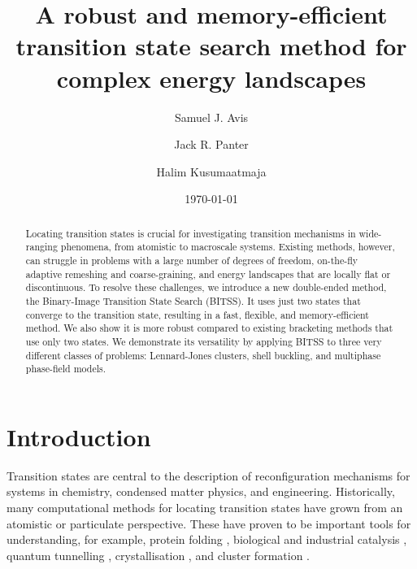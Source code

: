 \documentclass[aip,jcp,reprint,twocolumn]{revtex4-1}
\begin{document}
\title{A robust and memory-efficient transition state search method for complex energy landscapes}
\date{\today}

\author{Samuel J. Avis}
\author{Jack R. Panter}
\author{Halim Kusumaatmaja}

\begin{abstract}
  Locating transition states is crucial for investigating transition mechanisms in wide-ranging phenomena, from atomistic to macroscale systems.
  Existing methods, however, can struggle in problems with a large number of degrees of freedom, on-the-fly adaptive remeshing and coarse-graining, and energy landscapes that are locally flat or discontinuous.
  To resolve these challenges, we introduce a new double-ended method, the Binary-Image Transition State Search (BITSS).
  It uses just two states that converge to the transition state, resulting in a fast, flexible, and memory-efficient method.
  We also show it is more robust compared to existing bracketing methods that use only two states.
  We demonstrate its versatility by applying BITSS to three very different classes of problems: Lennard-Jones clusters, shell buckling, and multiphase phase-field models.
\end{abstract}

\maketitle


\section{Introduction}
Transition states are central to the description of reconfiguration mechanisms for systems in chemistry, condensed matter physics, and engineering.
Historically, many computational methods for locating transition states have grown from an atomistic or particulate perspective.
These have proven to be important tools for understanding, for example, protein folding \cite{Bryngelson1995,Onuchic1997}, biological and industrial catalysis \cite{Boehr2006,Kerns2015,Guo2018a}, quantum tunnelling \cite{Richardson2016,Vaillant2019}, crystallisation \cite{Richard2018}, and cluster formation \cite{Wales1998,Wales2012}.
\end{document}
